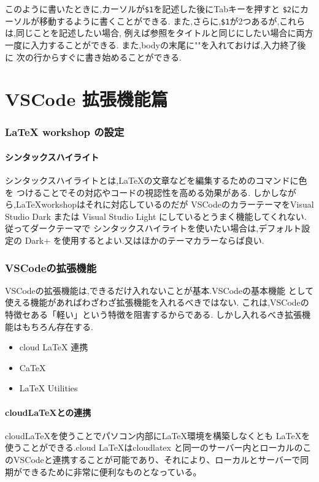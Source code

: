 \documentclass{ltjsarticle}
\begin{document}
このように書いたときに,カーソルが\verb|$1|を記述した後にTabキーを押すと
\verb|$2|にカーソルが移動するように書くことができる.
また,さらに,\verb|$1|が2つあるが,これらは,同じことを記述したい場合,
例えば参照をタイトルと同じにしたい場合に両方一度に入力することができる.
また,bodyの末尾に""を入れておけば,入力終了後に
次の行からすぐに書き始めることができる.


\part{VSCode 拡張機能篇}
\section{LaTeX workshop の設定}
\subsection{シンタックスハイライト}
シンタックスハイライトとは,LaTeXの文章などを編集するためのコマンドに色を
つけることでその対応やコードの視認性を高める効果がある.
しかしながら,\LaTeX workshopはそれに対応しているのだが
VSCodeのカラーテーマをVisual Studio Dark または Visual Studio Light
にしているとうまく機能してくれない.従ってダークテーマで
シンタックスハイライトを使いたい場合は,デフォルト設定の
Dark+ を使用するとよい.又はほかのテーマカラーならば良い.

\section{VSCodeの拡張機能}
VSCodeの拡張機能は,できるだけ入れないことが基本.VSCodeの基本機能
として使える機能があればわざわざ拡張機能を入れるべきではない.
これは,VSCodeの特徴セある「軽い」という特徴を阻害するからである.
しかし入れるべき拡張機能はもちろん存在する.
\begin{itemize}
\item cloud LaTeX 連携
\item CaTeX
\item LaTeX Utilities
\end{itemize}

\subsection{cloud\LaTeX との連携}
cloud\LaTeX を使うことでパソコン内部に\LaTeX 環境を構築しなくとも
\LaTeX を使うことができる.cloud \LaTeX はcloudlatex と同一のサーバー内とローカルのこのVSCodeと連携することが可能であり、それにより、ローカルとサーバーで同期ができるために非常に便利なものとなっている。
\end{document}
